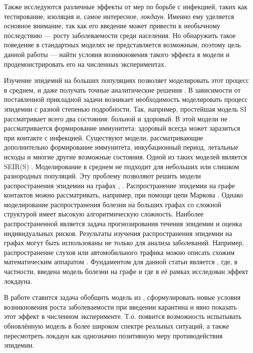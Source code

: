 	Также исследуются различные эффекты от мер по борьбе с инфекцией, таких как тестирование, изоляция и, самое интересное, \textit{локдаун}. Именно ему уделяется основное внимание, так как его введение может привести к необычному последствию --- росту заболеваемости среди населения. Но обнаружить такое поведение в стандартных моделях не представляется возможным, поэтому цель данной работы --- найти условия возникновения такого эффекта в модели и продемонстрировать его на численных экспериментах. 
	
	Изучение эпидемий на больших популяциях позволяет моделировать этот процесс в среднем, и даже получать точные аналитические решения \cite{harko2014exact}. В зависимости от поставленной прикладной задачи возникает необходимость моделировать процесс эпидемии с разной степенью подробности. Так, например, простейшая модель SI \cite{allen1994some} рассматривает всего два состояния: больной и здоровый. В этой модели не рассматривается формирование иммунитета: здоровый всегда может заразиться при контакте с инфекцией. Существуют модели, рассматривающие дополнительно формирование иммунитета, инкубационный период, летальные исходы и многие другие возможные состояния. Одной из таких моделей является SEIR(S) \cite{capasso2008mathematical}. Моделирование в среднем не подходит для небольших или слишком разнородных популяций. Эту проблему позволяют решить модели распространения эпидемии на графах \cite{moreno2002epidemic}, \cite{pastor2015epidemic}. Распространение эпидемии на графе контактов можно рассматривать, например, при помощи цепи Маркова \cite{gomez2010discrete}. Однако моделирование распространения болезни на больших графах со сложной структурой имеет высокую алгоритмическую сложность. Наиболее распространенной является задача прогнозирования течения эпидемии \cite{leitch2019toward} и оценка индивидуальных рисков. Результаты изучения распространения эпидемии на графах	могут быть использованы не только для анализа заболеваний. Например, распространение слухов или автомобильного трафика можно описать схожим математическим аппаратом \cite{de2013anatomy}. Фундаментом для данной статьи является \cite{base_article}, где, в частности, введена модель болезни на графе и где в её рамках исследован эффект локдауна.
	
	В работе ставится задача обобщить модель из \cite{base_article}, сформулировать новые условия возникновения роста заболеваемости при введении карантина и явно показать этот эффект в численном эксперименте. Т.о. появится возможность испытывать обновлённую модель в более широком спектре реальных ситуаций, а также пересмотреть локдаун как однозначно позитивную меру противодействия эпидемии.
	
